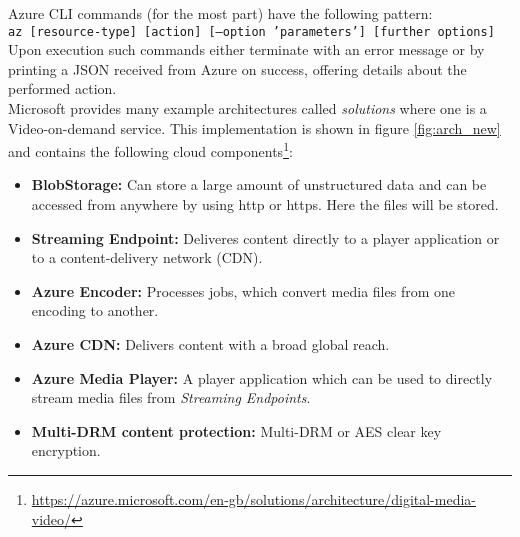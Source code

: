 Azure CLI commands (for the most part) have the following pattern:\\
\texttt{az [resource-type] [action] [--option 'parameters'] [further options]}\\
Upon execution such commands either terminate with an error message or by printing a JSON 
received from Azure on success, offering details about the performed action. \\
Microsoft provides many example architectures called \textit{solutions} where one is a Video-on-demand service.
This implementation is shown in figure \ref{fig:arch_new} and contains the 
following cloud components\footnote{\url{https://azure.microsoft.com/en-gb/solutions/architecture/digital-media-video/}}:
\begin{itemize}
    \item \textbf{BlobStorage:} Can store a large amount of unstructured data 
    and can be accessed from anywhere by using http or https. Here the files 
    will be stored.
    \item \textbf{Streaming Endpoint:} Deliveres content directly to a player 
    application or to a content-delivery network (CDN).
    \item \textbf{Azure Encoder:} Processes jobs, which convert media files from 
    one encoding to another.
    \item \textbf{Azure CDN:} Delivers content with a broad global reach.
    \item \textbf{Azure Media Player:} A player application which can be used 
    to directly stream media files from \textit{Streaming Endpoints}.
    \item \textbf{Multi-DRM content protection:} Multi-DRM or AES clear key encryption.
\end{itemize}
